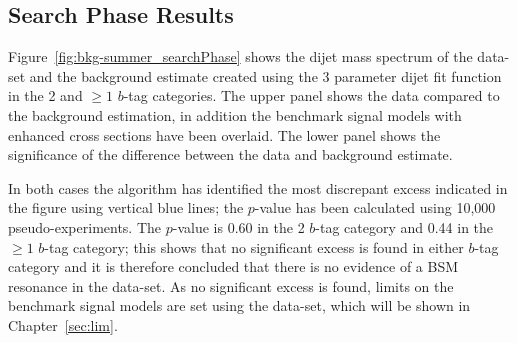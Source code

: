 \clearpage

\subsection{Search Phase Results}
\label{sec:bkg-summer_results}

Figure~\ref{fig:bkg-summer_searchPhase} shows the dijet mass spectrum of the
\summer{} data-set and the background estimate created using the 3 parameter dijet fit function
in the 2 and $\geq1$ $b$-tag categories.
The upper panel shows the data compared to the background estimation,
in addition the benchmark signal models with enhanced cross sections have been overlaid.
The lower panel shows the significance of the difference between the data and background estimate.

In both cases the \bh{} algorithm has identified the most discrepant excess indicated
in the figure using vertical blue lines;
the \bh{} \mbox{$p$-value} has been calculated using 10,000 pseudo-experiments.
The \bh{} \mbox{$p$-value} is 0.60 in the 2 $b$-tag category
and 0.44 in the $\geq1$ $b$-tag category;
this shows that no significant excess is found in either $b$-tag category and it is therefore concluded
that there is no evidence of a BSM resonance in the \summer{} data-set.
As no significant excess is found, limits on the benchmark signal models are set using the \summer{} data-set,
which will be shown in Chapter~\ref{sec:lim}.


